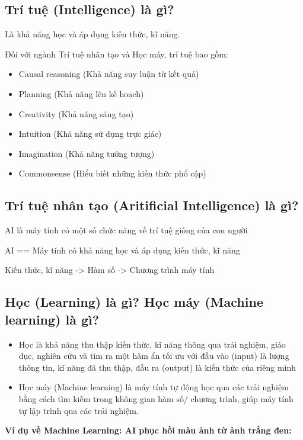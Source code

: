 \documentclass{article}
\begin{document}
\subsection{Trí tuệ (Intelligence) là gì?}

Là khả năng học và áp dụng kiến thức, kĩ năng.

Đối với ngành Trí tuệ nhân tạo và Học máy, trí tuệ bao gồm:

\begin{itemize}
    \item Causal reasoning (Khả năng suy luận từ kết quả)
    \item Planning (Khả năng lên kế hoạch)
    \item Creativity (Khả năng sáng tạo)
    \item Intuition (Khả năng sử dụng trực giác)
    \item Imagination (Khả năng tưởng tượng)
    \item Commonsense (Hiểu biết những kiến thức phổ cập)
\end{itemize}

\subsection{Trí tuệ nhân tạo (Aritificial Intelligence) là gì?}

AI là máy tính có một số chức năng về trí tuệ giống của con người

AI == Máy tính có khả năng học và áp dụng kiến thức, kĩ năng

Kiến thức, kĩ năng -> Hàm số -> Chương trình máy tính

\subsection{Học (Learning) là gì? Học máy (Machine learning) là gì?}
\begin{itemize}
    \item Học là khả năng thu thập kiến thức, kĩ năng thông qua trải nghiệm, giáo dục, nghiên cứu và tìm ra một hàm ẩn tối ưu với đầu vào (input) là lượng thông tin, kĩ năng đã thu thập, đầu ra (output) là kiến thức của riêng mình
    \item Học máy (Machine learning) là máy tính tự động học qua các trải nghiệm bằng cách tìm kiếm trong không gian hàm số/ chương trình, giúp máy tính tự lập trình qua các trải nghiệm.
\end{itemize}    

\textbf{Ví dụ về Machine Learning: AI phục hồi màu ảnh từ ảnh trắng đen:}
\end{document}
